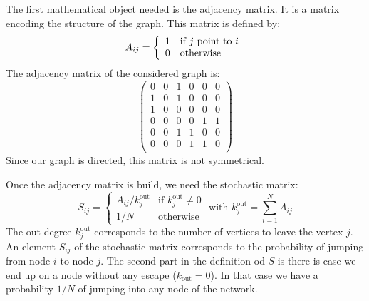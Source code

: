 The first mathematical object needed is the adjacency matrix. It is a matrix encoding the structure of the graph. This matrix is defined by:
\begin{equation}
    A_{ij} = \left\{\begin{array}{ll}
        1 & $if $j$ point to $i\\
        0 & \text{otherwise}
    \end{array} \right.
\end{equation}
The adjacency matrix of the considered graph is:
\[
    \begin{pmatrix}
        0 & 0 & 1 & 0 & 0 & 0\\
        1 & 0 & 1 & 0 & 0 & 0\\
        1 & 0 & 0 & 0 & 0 & 0\\
        0 & 0 & 0 & 0 & 1 & 1\\
        0 & 0 & 1 & 1 & 0 & 0\\
        0 & 0 & 0 & 1 & 1 & 0\\
    \end{pmatrix}
\]
Since our graph is directed, this matrix is not symmetrical.

Once the adjacency matrix is build, we need the stochastic matrix:
\begin{equation}
    S_{ij} = \left\{ \begin{array}{ll}
        A_{ij} / k_j^{\text{out}} & \text{if } k_j^{\text{out}} \neq 0\\
        1 / N & \text{otherwise} 
    \end{array} \right. \text{ with } k_j^{\text{out}} = \displaystyle\sum_{i=1}^{N} A_{ij}
\end{equation}
The out-degree $k_j^{\text{out}}$ corresponds to the number of vertices to leave the vertex $j$. An element $S_{ij}$ of the stochastic matrix corresponds to the probability of jumping from node $i$ to node $j$. The second part in the definition od $S$ is there is case we end up on a node without any escape ($k_{\text{out}} = 0$). In that case we have a probability $1/N$ of jumping into any node of the network.


